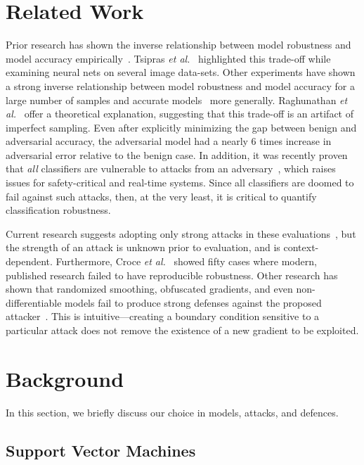 \documentclass[fonts]{icst}
\begin{document}
\section{Related Work}

Prior research has shown the inverse relationship between model robustness and model accuracy empirically~\cite{li2016general,tsipras2018robustness}.
Tsipras \textit{et al.}~\cite{tsipras2018robustness} highlighted this trade-off while examining neural nets on several image data-sets.
Other experiments have shown a strong inverse relationship between model robustness and model accuracy for a large number of samples and accurate models~\cite{raghunathan2020understanding} more generally.
Raghunathan \textit{et al.}~\cite{raghunathan2020understanding} offer a theoretical explanation, suggesting that this trade-off is an artifact of imperfect sampling.
Even after explicitly minimizing the gap between benign and adversarial accuracy, the adversarial model had a nearly 6 times increase in adversarial error relative to the benign case.
In addition, it was recently proven that \textit{all} classifiers are vulnerable to attacks from an adversary~\cite{dohmatob2019generalized}, which raises issues for safety-critical and real-time systems.
Since all classifiers are doomed to fail against such attacks, then, at the very least, it is critical to quantify classification robustness.

Current research suggests adopting only strong attacks in these evaluations~\cite{carlini2019evaluating}, but the strength of an attack is unknown prior to evaluation, and is context-dependent.
Furthermore, Croce \textit{et al.}~\cite{croce2020reliable} showed fifty cases where modern, published research failed to have reproducible robustness.
Other research has shown that randomized smoothing, obfuscated gradients, and even non-differentiable models fail to produce strong defenses against the proposed attacker~\cite{carlini2017towards,athalye2018obfuscated,uesato2018adversarial}.
This is intuitive---creating a boundary condition sensitive to a particular attack does not remove the existence of a new gradient to be exploited.


\section{Background}
In this section, we briefly discuss our choice in models, attacks, and defences.
\subsection{Support Vector Machines}
\end{document}
